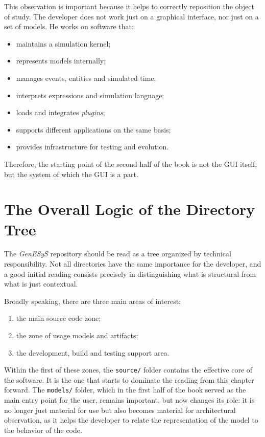 This observation is important because it helps to correctly reposition the object of study. The developer does not work just on a graphical interface, nor just on a set of models. He works on software that:

\begin{itemize}
 \item maintains a simulation kernel;
 \item represents models internally;
 \item manages events, entities and simulated time;
 \item interprets expressions and simulation language;
 \item loads and integrates \textit{plugins};
 \item supports different applications on the same basis;
 \item provides infrastructure for testing and evolution.
\end{itemize}

Therefore, the starting point of the second half of the book is not the GUI itself, but the system of which the GUI is a part.

\section{The Overall Logic of the Directory Tree}
\label{sec:cap6_logica_geral_arvore_diretorios}

The \textit{GenESyS} repository should be read as a tree organized by technical responsibility. Not all directories have the same importance for the developer, and a good initial reading consists precisely in distinguishing what is structural from what is just contextual.

Broadly speaking, there are three main areas of interest:

\begin{enumerate}
 \item the main source code zone;
 \item the zone of usage models and artifacts;
 \item the development, build and testing support area.
\end{enumerate}

Within the first of these zones, the \texttt{source/} folder contains the effective core of the software. It is the one that starts to dominate the reading from this chapter forward. The \texttt{models/} folder, which in the first half of the book served as the main entry point for the user, remains important, but now changes its role: it is no longer just material for use but also becomes material for architectural observation, as it helps the developer to relate the representation of the model to the behavior of the code.

